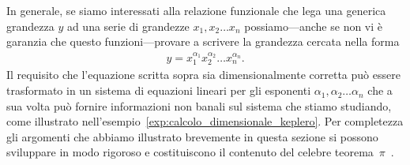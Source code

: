 In generale, se siamo interessati alla relazione funzionale che lega una
generica grandezza $y$ ad una serie di grandezze $x_1, x_2 \ldots x_n$
possiamo---anche se non vi è garanzia che questo funzioni---provare a
scrivere la grandezza cercata nella forma
\begin{align}
  y = x_1^{\alpha_1}x_2^{\alpha_2} \ldots x_n^{\alpha_n}.
\end{align}
Il requisito che l'equazione scritta sopra sia dimensionalmente corretta può
essere trasformato in un sistema di equazioni lineari per gli esponenti
$\alpha_1, \alpha_2 \ldots \alpha_n$ che a sua volta può fornire informazioni
non banali sul sistema che stiamo studiando, come illustrato
nell'esempio~\ref{exp:calcolo_dimensionale_keplero}.
Per completezza gli argomenti che abbiamo illustrato brevemente in questa
sezione si possono sviluppare in modo rigoroso e costituiscono il contenuto del
celebre teorema~$\pi$~\cite{teorema_pi}.


